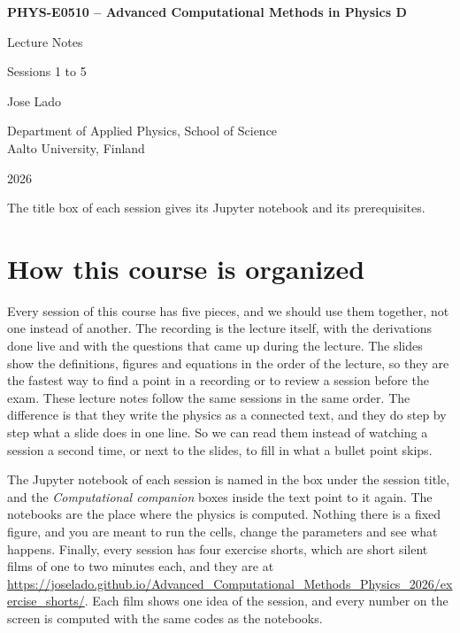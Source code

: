 \documentclass[11pt]{article}
\begin{document}
\begin{titlepage}
\centering
\vspace*{3cm}
{\Huge\bfseries\color{coursedark} PHYS-E0510 -- Advanced Computational Methods in Physics D\par}
\vspace{0.8cm}
{\Large\color{courseaccent} Lecture Notes\par}
\vspace{0.3cm}
{\large Sessions 1 to 5\par}
\vspace{2cm}
{\large Jose Lado\par}
\vspace{0.5cm}
{\large Department of Applied Physics, School of Science\\Aalto University, Finland\par}
\vspace{0.5cm}
{\large 2026\par}
\vfill
{\small The title box of each session gives its Jupyter notebook and its
prerequisites.\par}
\end{titlepage}

\section*{How this course is organized}

Every session of this course has five pieces, and we should use them together, not one instead
of another. The recording is the lecture itself, with the derivations done live and with the
questions that came up during the lecture. The slides show the definitions, figures and equations
in the order of the lecture, so they are the fastest way to find a point in a recording or to
review a session before the exam. These lecture notes follow the same sessions in the same order.
The difference is that they write the physics as a connected text, and they do step by step what a
slide does in one line. So we can read them instead of watching a session a second time, or next
to the slides, to fill in what a bullet point skips.

The Jupyter notebook of each session is named in the box under the session title, and the
\emph{Computational companion} boxes inside the text point to it again. The notebooks are the place
where the physics is computed. Nothing there is a fixed figure, and you are meant to run the cells,
change the parameters and see what happens. Finally, every session has four exercise shorts, which
are short silent films of one to two minutes each, and they are at
\url{https://joselado.github.io/Advanced_Computational_Methods_Physics_2026/exercise_shorts/}. Each
film shows one idea of the session, and every number on the screen is computed with the same codes
as the notebooks.
\end{document}
